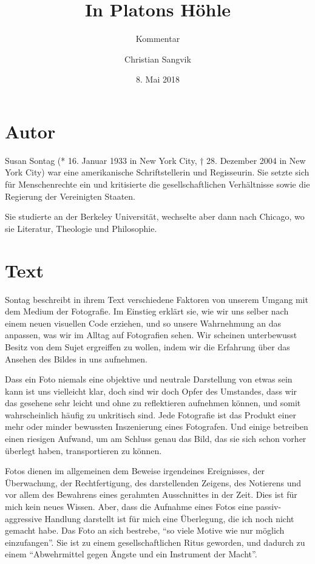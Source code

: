 \documentclass[a4paper,ngerman,11pt]{scrartcl}
\subtitle{Kommentar}
\author{Christian Sangvik}
\date{8. Mai 2018}
\title{In Platons Höhle}
\begin{document}
\maketitle

\section*{Autor}
\label{sec-1}

Susan Sontag (* 16. Januar 1933 in New York City, † 28. Dezember 2004 in New
York City) war eine amerikanische Schriftstellerin und Regisseurin. Sie setzte
sich für Menschenrechte ein und kritisierte die gesellschaftlichen
Verhältnisse sowie die Regierung der Vereinigten Staaten.\cite{wiki:Sontag-de}

Sie studierte an der Berkeley Universität, wechselte aber dann nach Chicago,
wo sie Literatur, Theologie und Philosophie.\cite{wiki:Sontag-de}

\section*{Text}
\label{sec-2}

Sontag beschreibt in ihrem Text verschiedene Faktoren von unserem Umgang mit
dem Medium der Fotografie. Im Einstieg erklärt sie, wie wir uns selber nach
einem neuen visuellen Code erziehen, und so unsere Wahrnehmung an das
anpassen, was wir im Alltag auf Fotografien sehen.\cite{Sontag2010} Wir scheinen
unterbewusst Besitz von dem Sujet ergreiffen zu wollen, indem wir die
Erfahrung über das Ansehen des Bildes in uns aufnehmen.

Dass ein Foto niemals eine objektive und neutrale Darstellung von etwas sein
kann ist uns vielleicht klar, doch sind wir doch Opfer des Umstandes, dass wir
das gesehene sehr leicht und ohne zu reflektieren aufnehmen können, und somit
wahrscheinlich häufig zu unkritisch sind. Jede Fotografie ist das Produkt
einer mehr oder minder bewussten Inszenierung eines Fotografen. Und einige
betreiben einen riesigen Aufwand, um am Schluss genau das Bild, das sie sich
schon vorher überlegt haben, transportieren zu können.

Fotos dienen im allgemeinen dem Beweise irgendeines Ereignisses, der
Überwachung, der Rechtfertigung, des darstellenden Zeigens, des Notierens und
vor allem des Bewahrens eines gerahmten Ausschnittes in der Zeit. Dies ist für
mich kein neues Wissen. Aber, dass die Aufnahme eines Fotos eine
passiv-aggressive Handlung darstellt \cite{Sontag2010} ist für mich eine
Überlegung, die ich noch nicht gemacht habe. Das Foto an sich bestrebe, "`so
viele Motive wie nur möglich einzufangen"'.\cite{Sontag2010} Sie ist zu einem
gesellschaftlichen Ritus geworden, und dadurch zu einem "`Abwehrmittel gegen
Ängste und ein Instrument der Macht"'.
\end{document}
